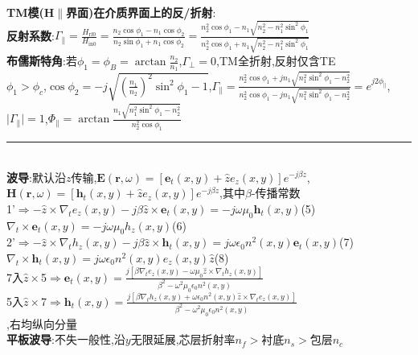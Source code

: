 \documentclass[a4paper,10pt]{article}
\providecommand{\abs}[1]{\lvert#1\rvert}
\begin{document}
\begin{multicols}{2}
\textbf{TM模($\bm{H}\parallel$界面)在介质界面上的反/折射}:\\
\indent\textbf{反射系数}:$\Gamma_{\parallel}=\frac{H_{\text{rf}0}}{H_{\text{in}0}}=\frac{n_2\cos\phi_1-n_1\cos\phi_2}{n_2\sin\phi_1+n_1\cos\phi_2}=\frac{n_2^2\cos\phi_1-n_1\sqrt{n_2^2-n_1^2\sin^2\phi_1}}{n_2^2\cos\phi_1+n_1\sqrt{n_2^2-n_1^2\sin^2\phi_1}}$\\
\indent\textbf{布儒斯特角}:若$\phi_1=\phi_B=\arctan\frac{n_2}{n_1}$,$\Gamma_{\perp}=0$,TM全折射,反射仅含TE\\
$\phi_1>\phi_c$,$\cos\phi_2=-j\sqrt{(\frac{n_1}{n_2})^2\sin^2\phi_1-1}$,$\Gamma_{\parallel}=\frac{n_2^2\cos\phi_1+jn_1\sqrt{n_1^2\sin^2\phi_1-n_2^2}}{n_2^2\cos\phi_1-jn_1\sqrt{n_1^2\sin^2\phi_1-n_2^2}}=e^{j2\phi_{\parallel}}$,$\abs{\Gamma_{\parallel}}=1$,$\Phi_{\parallel}=\arctan\frac{n_1\sqrt{n_1^2\sin^2\phi_1-n_2^2}}{n_2^2\cos\phi_1}$\\
\rule{\columnwidth}{.5pt}\\
\textbf{波导}:默认沿$z$传输,$\bm{E}(\bm{r},\omega)=[\bm{e}_t(x,y)+\hat{z}e_z(x,y)]e^{-j\beta z}$,$\bm{H}(\bm{r},\omega)=[\bm{h}_t(x,y)+\hat{z}e_z(x,y)]e^{-j\beta z}$,其中$\beta$-传播常数\\
\indent\textcircled{\tiny{1'}}$\Rightarrow-\hat{z}\times\nabla_te_z(x,y)-j\beta\hat{z}\times\bm{e}_t(x,y)=-j\omega\mu_0\bm{h}_t(x,y)$(\textcircled{\tiny{5}})\\
\indent\indent$\nabla_t\times\bm{e}_t(x,y)=-j\omega\mu_0h_z(x,y)$(\textcircled{\tiny{6}})\\
\indent\textcircled{\tiny{2'}}$\Rightarrow-\hat{z}\times\nabla_th_z(x,y)-j\beta\hat{z}\times\bm{h}_t(x,y)=j\omega\epsilon_0n^2(x,y)\bm{e}_t(x,y)$(\textcircled{\tiny{7}})\\
\indent\indent$\nabla_t\times\bm{h}_t(x,y)=j\omega\epsilon_0n^2(x,y)e_z(x,y)\hat{z}$(\textcircled{\tiny{8}})\\
\indent\textcircled{\tiny{7}}入$\hat{z}\times$\textcircled{\tiny{5}}$\Rightarrow\bm{e}_t(x,y)=\frac{j[\beta\nabla_te_z(x,y)-\omega\mu_0\hat{z}\times\nabla_th_z(x,y)]}{\beta^2-\omega^2\mu_0\epsilon_0n^2(x,y)}$\\
\indent\textcircled{\tiny{5}}入$\hat{z}\times$\textcircled{\tiny{7}}$\Rightarrow\bm{h}_t(x,y)=\frac{j[\beta\nabla_th_z(x,y)+\omega\epsilon_0n^2(x,y)\hat{z}\times\nabla_te_z(x,y)]}{\beta^2-\omega^2\mu_0\epsilon_0n^2(x,y)}$\\
,右均纵向分量\\
\textbf{平板波导}:不失一般性,沿$y$无限延展,芯层折射率$n_f>$衬底$n_s>$包层$n_c$\\

\end{multicols}
\end{document}
